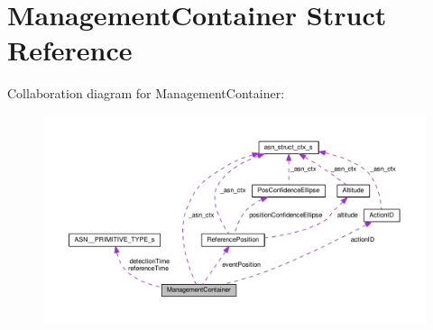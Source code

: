 \hypertarget{structManagementContainer}{}\section{Management\+Container Struct Reference}
\label{structManagementContainer}


Collaboration diagram for Management\+Container\+:\nopagebreak
\begin{figure}[H]
\begin{center}
\leavevmode
\includegraphics[width=350pt]{structManagementContainer__coll__graph}
\end{center}
\end{figure}
